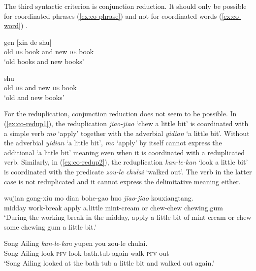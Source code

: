 The third syntactic criterion is conjunction reduction. It should only be possible for coordinated phrases (\ref{ex:co-phrase}) and not for coordinated words (\ref{ex:co-word}) \citetext{\citealp[137]{Duanmu1998}; \citealp[283]{Schaefer2009}}.

\ea\label{ex:co-phrase}
  \ea {} gen [xin de shu]\\
  old \textsc{de} book and new \textsc{de} book\\ 
  \glt `old books and new books'
  
  \ex {} shu\\
  old \textsc{de} and new \textsc{de} book\\ 
  \glt `old and new books'
   \z
\z

\ea\label{ex:co-word}
  
  \z
\z

For the reduplication, conjunction reduction does not seem to be possible. 
In (\ref{ex:co-redup1}), the reduplication \textit{jiao-jiao} `chew a little bit' is coordinated with a simple verb \textit{mo} `apply' together with the adverbial \textit{yidian} `a little bit'.
Without the adverbial \textit{yidian} `a little bit', \textit{mo} `apply' by itself cannot express the additional `a little bit' meaning even when it is coordinated with a reduplicated verb.
Similarly, in (\ref{ex:co-redup2}), the reduplication \textit{kan-le-kan} `look a little bit' is coordinated with the predicate \textit{zou-le chulai} `walked out'. The verb in the latter case is not reduplicated and it cannot express the delimitative meaning either.

\ea
  \ea\label{ex:co-redup1}
  \gll wujian gong-xiu mo dian bohe-gao huo \textit{jiao}-\textit{jiao} kouxiangtang.\\
    midday work-break apply a.little mint-cream or chew-chew chewing.gum\\ 
    \glt `During the working break in the midday, apply a little bit of mint cream or chew some chewing gum a little bit.'
    
   \ex\label{ex:co-redup2}
   \gll Song Ailing \textit{kan}-\textit{le}-\textit{kan} yupen you zou-le chulai.\\
   Song Ailing look-\textsc{pfv}-look bath.tub again walk-\textsc{pfv} out\\  
   \glt `Song Ailing looked at the bath tub a little bit and walked out again.'
   \z
\z

